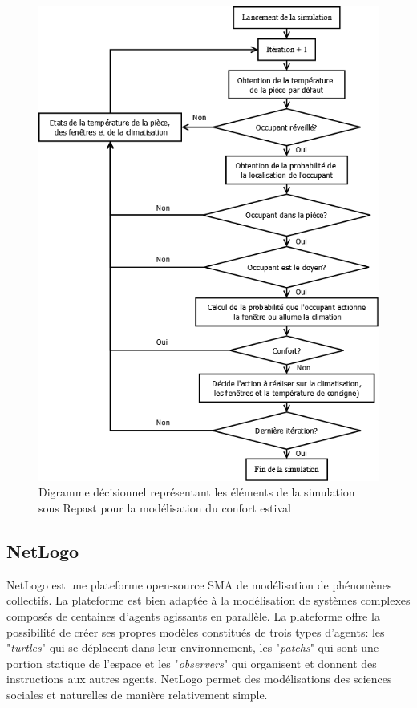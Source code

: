 \begin{figure}[H]
\centering
\includegraphics[scale=0.4]{Images/diagrammes_SMA/Repast}
\caption{Digramme décisionnel représentant les éléments de la simulation sous Repast pour la modélisation du confort estival}
\label{fig:Diagramme_Repast}
\end{figure}

\subsection{NetLogo}

NetLogo est une plateforme open-source SMA de modélisation de phénomènes collectifs. La plateforme est bien adaptée à la modélisation de systèmes complexes composés de centaines d'agents agissants en parallèle. La plateforme offre la possibilité de créer ses propres modèles constitués de trois types d'agents: les "\textit{turtles}" qui se déplacent dans leur environnement, les "\textit{patchs}" qui sont une portion statique de l'espace et les "\textit{observers}" qui organisent et donnent des instructions aux autres agents. NetLogo permet des modélisations des sciences sociales et naturelles de manière relativement simple.

